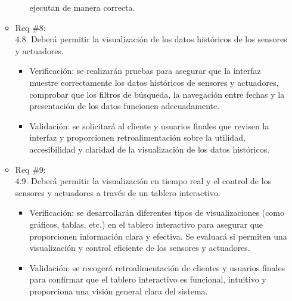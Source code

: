 \begin{itemize}
\begin{itemize}
\begin{itemize}
			                  ejecutan de manera correcta.
		            \end{itemize}
		      \item Req \#8: \\ 4.8. Deberá permitir la visualización de los datos históricos de
		            los sensores y actuadores.
		            \begin{itemize}
			            \item Verificación: se realizarán pruebas para asegurar que la interfaz muestre
			                  correctamente los datos históricos de sensores y actuadores, comprobar que los
			                  filtros de búsqueda, la navegación entre fechas y la presentación de los datos
			                  funcionen adecuadamente.
			            \item Validación: se solicitará al cliente y usuarios finales que revisen la interfaz
			                  y proporcionen retroalimentación sobre la utilidad, accesibilidad y claridad de
			                  la visualización de los datos históricos.
		            \end{itemize}
		      \item Req \#9: \\ 4.9. Deberá permitir la visualización en tiempo real y el control
		            de los sensores y actuadores a través de un tablero interactivo.
		            \begin{itemize}
			            \item Verificación: se desarrollarán diferentes tipos de visualizaciones (como
			                  gráficos, tablas, etc.) en el tablero interactivo para asegurar que
			                  proporcionen información clara y efectiva. Se evaluará si permiten una
			                  visualización y control eficiente de los sensores y actuadores.
			            \item Validación: se recogerá retroalimentación de clientes y usuarios finales para
			                  confirmar que el tablero interactivo es funcional, intuitivo y proporciona una
			                  visión general clara del sistema.
		            \end{itemize}
	      \end{itemize}


\end{itemize}
